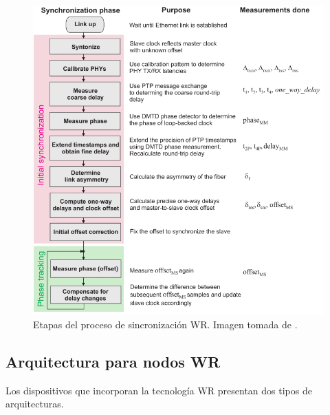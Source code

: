 \begin{figure}
	\centering
	\includegraphics[width=\linewidth]{imagenes/wr_sync}
	\caption[Etapas del proceso de sincronización WR]{Etapas del proceso de 
	sincronización WR. Imagen tomada de \cite{Wlostowski2011}.}
	\label{fig:wrsync}
\end{figure}

\subsection{Arquitectura para nodos WR}

Los dispositivos que incorporan la tecnología WR presentan dos tipos de 
arquitecturas.

